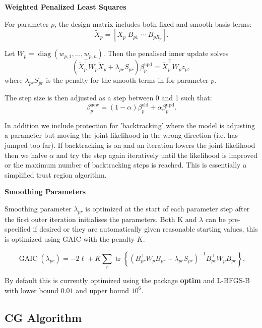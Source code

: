 \documentclass{article}
\newcommand{\pkg}{\textbf}
\begin{document}
\textbf{Weighted Penalized Least Squares}

For parameter $p$, the design matrix includes both fixed and smooth basis terms:
\begin{equation*}
\widetilde X_p = [X_p \; B_{p1} \; \cdots \; B_{pR_p}].
\end{equation*}

Let $W_p = \operatorname{diag}(w_{p,1},\dots,w_{p,n})$. Then the penalised inner update solves
\begin{equation*}
\left(\widetilde X_p^\top W_p \widetilde X_p + \lambda_{pr}S_{pr}\right)\beta_p^{\text{upd}}
= \widetilde X_p^\top W_p z_p,
\end{equation*}
where $\lambda_{pr}S_{pr}$ is the penalty for the smooth terms in for parameter $p$.

The step size is then adjusted as a step between 0 and 1 such that:
\begin{equation*}
\beta_p^{\text{new}} = (1-\alpha)\beta_p^{\text{old}} + \alpha\beta_p^{\text{upd}}.
\end{equation*}

In addition we include protection for 'backtracking' where the model is adjusting a parameter but moving the joint likelihood in the wrong direction (i.e. has jumped too far). If backtracking is on and an iteration lowers the joint likelihood then we halve $\alpha$ and try the step again iteratively until the likelihood is improved or the maximum number of backtracking steps is reached. This is essentially a simplified trust region algorithm.

\textbf{Smoothing Parameters}

Smoothing parameter $\lambda_{pr}$ is optimized at the start of each parameter step after the first outer iteration initialises the parameters. Both K and $\lambda$ can be pre-specified if desired or they are automatically given reasonable starting values, this is optimized using GAIC with the penalty $K$.

\begin{equation*}
\operatorname{GAIC}(\lambda_{pr}) = -2\ell + K \sum_r \operatorname{tr}\left\{\left(B_{pr}^\top W_p B_{pr} + \lambda_{pr}S_{pr}\right)^{-1} B_{pr}^\top W_p B_{pr}\right\},
\end{equation*}

By default this is currently optimized using the package \pkg{optim} and L-BFGS-B with lower bound $0.01$ and upper bound
$10^6$.

\subsection{CG Algorithm}
\end{document}
